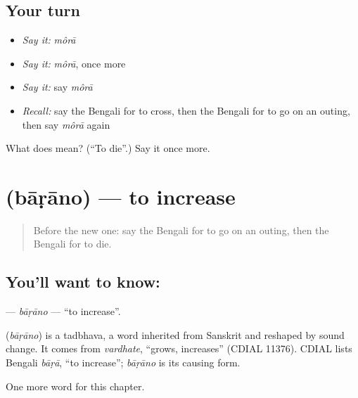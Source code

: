 \subsection*{Your turn}
\begin{itemize}
\raggedright
  \item \emph{Say it:} \emph{môrā}
  \item \emph{Say it:} \emph{môrā}, once more
  \item \emph{Say it:} say \emph{môrā}
  \item \emph{Recall:} say the Bengali for to cross, then the Bengali for to go on an outing, then say \emph{môrā} again
\end{itemize}

\begin{tcolorbox}[breakable,colback=teal!4,colframe=teal!35!black,title={Before you move on}]
What does  mean? (\textquotedblleft{}To die\textquotedblright{}.) Say it once more.
\end{tcolorbox}
\section[\texorpdfstring{\bn{বাড়ানো} (bāṛāno)}{বাড়ানো (bāṛāno)}]{ (bāṛāno) — to increase}

\label{lesson:BN-C238-barano}



\begin{quote}
Before the new one: say the Bengali for to go on an outing, then the Bengali for to die.
\end{quote}

\subsection*{You'll want to know: }
\textbf{} — \emph{bāṛāno} — \textquotedblleft{}to increase\textquotedblright{}.

\begin{cousinweb}
\textbf{} (\emph{bāṛāno}) is a tadbhava, a word inherited from Sanskrit and reshaped by sound change. It comes from \emph{vardhate}, \textquotedblleft{}grows, increases\textquotedblright{} (CDIAL 11376). CDIAL lists Bengali \emph{bāṛā}, \textquotedblleft{}to increase\textquotedblright{}; \emph{bāṛāno} is its causing form.
\end{cousinweb}

\begin{grammarlens}[title={What you've built}]
One more word for this chapter.
\end{grammarlens}

